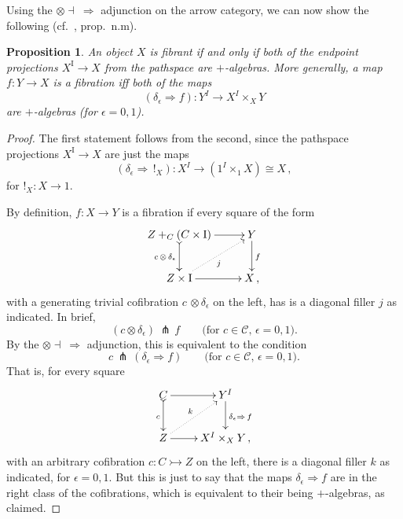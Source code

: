 \documentclass[11pt]{article}
\newcommand{\mono}{\ensuremath{\rightarrowtail}}
\newcommand{\I}{\ensuremath{\mathrm{I}}}
\newtheorem{proposition}[theorem]{Proposition}
\theoremstyle{remark}
\theoremstyle{definition}
\begin{document}
Using the $\otimes\dashv\ \Rightarrow$ adjunction on the arrow category, we can now show the following (cf.~\cite{GG}, prop.~n.m).

\begin{proposition}\label{prop:algequivfill}
An object $X$ is fibrant if and only if both of the endpoint  projections $X^\I \to X$ from the pathspace are $+$-algebras. More generally, a map $f : Y\to X$ is a fibration iff both of the maps $$(\delta_\epsilon \Rightarrow f) : Y^I \to X^I\times_X Y$$ are $+$-algebras (for $\epsilon = 0,1$).
\end{proposition}
\begin{proof}
The first statement follows from the second, since the pathspace projections $X^\I \to X$  are just the maps 
$$(\delta_\epsilon \Rightarrow\, !_X) : X^I \to (1^I\times_1 X) \cong X\,,$$
for $!_X : X \to 1$.

By definition, $f : X\to Y$ is a fibration if every square of the form
\begin{equation}
\xymatrix{
Z +_C (C\times\I) \ar@{>->}[d]_{c\, \otimes\, \delta_\epsilon} \ar[r] & Y \ar[d]^f \\
Z\times \I \ar@{.>}[ru]_{j} \ar[r] & X\,,
}
\end{equation}
with a generating trivial cofibration $c\, \otimes \delta_\epsilon$ on the left, has is a diagonal filler $j$ as indicated. In brief,
\[
(c\otimes\delta_\epsilon)\, \pitchfork\, f \qquad\text{(for $c\in \mathcal{C}$, $\epsilon = 0,1$)}.
\]
By the $\otimes\dashv\ \Rightarrow$ adjunction, this is equivalent to the condition  
\[
c\, \pitchfork\, (\delta_\epsilon\!\Rightarrow\! f) \qquad\text{(for $c\in \mathcal{C}$, $\epsilon = 0,1$)}.
\]
That is, for every square 
\begin{equation*}
\xymatrix{
C \ar@{>->}[d]_{c} \ar[r] & Y^I \ar[d]^{\delta_\epsilon \Rightarrow\,f} \\
Z \ar@{.>}[ru]^{k} \ar[r] & X^I\times_X Y\,,
}
\end{equation*}
with an arbitrary cofibration $c : C \mono Z$ on the left, there is a diagonal filler $k$ as indicated, for  $\epsilon = 0,1$. 
But this is just to say that the maps $\delta_\epsilon\Rightarrow{f}$ are in the right class of the cofibrations, which is equivalent to their being $+$-algebras, as claimed.
\end{proof}
\end{document}
